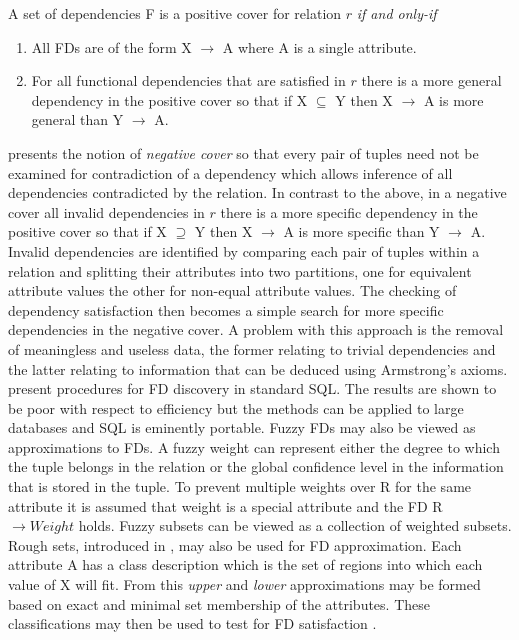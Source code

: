 \begin{definition}
\begin{rm}
A set of dependencies F is a positive cover for relation $r$ {\em if and
only-if}
\begin{enumerate}
\item All FDs are of the form X $\to$ A where A is
a single attribute.
\item For all functional dependencies that are satisfied in $r$ there is a
more general dependency in the positive cover so that if X $\subseteq$
Y then X $\rightarrow$ A is more general than Y $\rightarrow$ A.
\end{enumerate}
\end{rm}
\end{definition}

\cite{sf93} presents the notion of {\em negative cover} so that every pair
of tuples need not be examined for contradiction of a dependency which
allows inference of all dependencies contradicted by the relation.
In contrast to the above, in a negative cover all invalid dependencies
in $r$ there is a more specific dependency in the positive cover so that
if X $\supseteq$ Y then X $\rightarrow$ A is  more specific than Y
$\rightarrow$ A. Invalid dependencies are identified by comparing each
pair of tuples 
within a relation and splitting their attributes into two partitions,
one for equivalent attribute values the other for non-equal attribute
values.  The checking of dependency satisfaction then becomes a simple
search for more specific dependencies in the negative cover. A problem
with this approach is the removal of meaningless and useless data, the
former relating to trivial dependencies and the latter relating to
information  that can be deduced using Armstrong's axioms.
\cite{bb95} present procedures for FD discovery in standard SQL. The
results are shown to be poor with respect to efficiency but the
methods can be applied to large databases and SQL is eminently portable.
\smallskip
{}
Fuzzy FDs \cite{bdp94,hfs94} may also be viewed as approximations to FDs.
A fuzzy weight can represent either the degree to which the tuple
belongs in the relation or the global confidence level in the
information that is stored in the tuple. To prevent multiple weights
over R for the same attribute it is assumed that weight is a special
attribute and the FD R $\to Weight$ holds.  Fuzzy subsets can be
viewed as a collection of weighted subsets. Rough sets, introduced in
\cite{wz86}, may also be used for FD approximation. Each attribute A
has a class description which is the set of regions into which
each value of X will fit. From this {\em upper} and {\em lower}
approximations may be formed based on exact and minimal set membership
of the attributes. These classifications may then be used to test for
FD satisfaction \cite{bpb95}.

